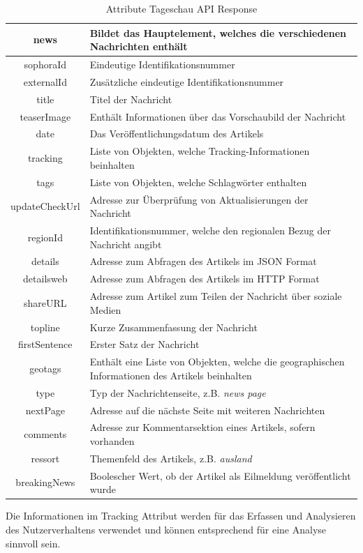 \begin{table}[bp!]   
    \centering
    \caption{Attribute Tageschau API Response}
    \label{tab:Attribute Tageschau API Response}
    \begin{tabular}{|c|p{11cm}|} \hline 
        news & Bildet das Hauptelement, welches die verschiedenen Nachrichten enthält \\ \hline 
        sophoraId & Eindeutige Identifikationsnummer \\ \hline 
        externalId & Zusätzliche eindeutige Identifikationsnummer \\ \hline 
        title & Titel der Nachricht \\ \hline 
        teaserImage & Enthält Informationen über das Vorschaubild der Nachricht \\ \hline 
        date & Das Veröffentlichungsdatum des Artikels \\ \hline 
        tracking & Liste von Objekten, welche Tracking-Informationen beinhalten\\ \hline 
        tags & Liste von Objekten, welche Schlagwörter enthalten \\ \hline 
        updateCheckUrl & Adresse zur Überprüfung von Aktualisierungen der Nachricht \\ \hline 
        regionId & Identifikationsnummer, welche den regionalen Bezug der Nachricht angibt \\ \hline 
        details & Adresse zum Abfragen des Artikels im JSON Format \\ \hline 
        detailsweb & Adresse zum Abfragen des Artikels im HTTP Format \\ \hline 
        shareURL & Adresse zum Artikel zum Teilen der Nachricht über soziale Medien \\ \hline 
        topline & Kurze Zusammenfassung der Nachricht \\ \hline 
        firstSentence & Erster Satz der Nachricht \\ \hline 
        geotags & Enthält eine Liste von Objekten, welche die geographischen Informationen des Artikels beinhalten \\ \hline 
        type & Typ der Nachrichtenseite, z.B. \textit{news page} \\ \hline 
        nextPage & Adresse auf die nächste Seite mit weiteren Nachrichten \\ \hline 
        comments & Adresse zur Kommentarsektion eines Artikels, sofern vorhanden \\ \hline 
        ressort & Themenfeld des Artikels, z.B. \textit{ausland} \\ \hline 
        breakingNews & Boolescher Wert, ob der Artikel als Eilmeldung veröffentlicht wurde \\ \hline
    \end{tabular}
\end{table}
\newpage
Die Informationen im Tracking Attribut werden für das Erfassen und Analysieren des Nutzerverhaltens verwendet und können entsprechend für eine Analyse sinnvoll sein. 

